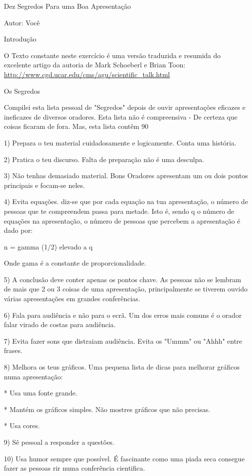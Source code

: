 \documentclass[12pt]{article}
\begin{document}
Dez Segredos Para uma Boa Apresentação

Autor: Você

Introdução

O Texto constante neste exercício é uma versão traduzida e resumida do excelente artigo da autoria de Mark Schoeberl e Brian Toon:
\url{http://www.cgd.ucar.edu/cms/agu/scientific_talk.html}

Os Segredos

Compilei esta lista pessoal de "Segredos" depois de ouvir apresentações eficazes e ineficazes de diversos oradores. Esta lista não é compreensiva - De certeza que coisas ficaram de fora. Mas, esta lista contêm 90%

1) Prepara o teu material cuidadosamente e logicamente. Conta uma história.

2) Pratica o teu discurso. Falta de preparação não é uma desculpa.

3) Não tenhas demasiado material. Bons Oradores apresentam um ou dois pontos principais e focam-se neles.

4) Evita equações. diz-se que por cada equação na tua apresentação, o número de pessoas que te compreendem passa para metade. Isto é, sendo q o número de equações na apresentação, o número de pessoas que percebem a apresentação é dado por:

n = gamma (1/2) elevado a q

Onde gama é a constante de proporcionalidade.

5) A conclusão deve conter apenas os pontos chave. As pessoas não se lembram de mais que 2 ou 3 coisas de uma apresentação, principalmente se tiverem ouvido várias apresentações em grandes conferências.

6) Fala para audiência e não para o ecrã. Um dos erros mais comuns é o orador falar virado de costas para audiência. 

7) Evita fazer sons que distraiam audiência. Evita os "Ummm" ou "Ahhh" entre frases.

8) Melhora os teus gráficos. Uma pequena lista de dicas para melhorar gráficos numa apresentação:

* Usa uma fonte grande.

* Mantém os gráficos simples. Não mostres gráficos que não precisas.

* Usa cores.

9) Sê pessoal a responder a questões.

10) Usa humor sempre que possível. É fascinante como uma piada seca consegue fazer as pessoas rir numa conferência cientifica.
\end{document}
